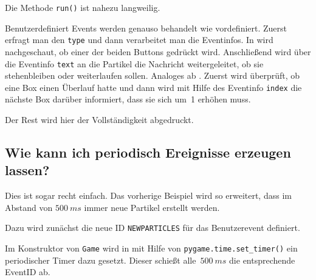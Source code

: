 
Die Methode \texttt{run()} ist nahezu langweilig.


Benutzerdefiniert Events werden genauso behandelt wie vordefiniert. Zuerst erfragt man den \texttt{type} und dann verarbeitet man die Eventinfos. In  wird nachgeschaut, ob einer der beiden Buttons gedrückt wird. Anschließend wird über die Eventinfo \texttt{text} an die Partikel die Nachricht weitergeleitet, ob sie stehenbleiben oder weiterlaufen sollen. Analoges ab . Zuerst wird überprüft, ob eine Box einen Überlauf hatte und dann wird mit Hilfe des Eventinfo \texttt{index} die nächste Box darüber informiert, dass sie sich um~1 erhöhen muss.


Der Rest wird hier der Vollständigkeit abgedruckt.


\subsection{Wie kann ich periodisch Ereignisse erzeugen lassen?}\label{eventtime}

Dies ist sogar recht einfach. Das vorherige Beispiel wird so erweitert, dass im Abstand von $500~ms$ immer neue Partikel erstellt werden.

Dazu wird zunächst die neue ID \texttt{NEWPARTICLES} für das Benutzerevent definiert.


Im Konstruktor von \texttt{Game} wird in  mit Hilfe von \texttt{pygame.time.set\_timer()} ein periodischer Timer dazu gesetzt. Dieser schießt alle~$500~ms$ die entsprechende EventID ab.


